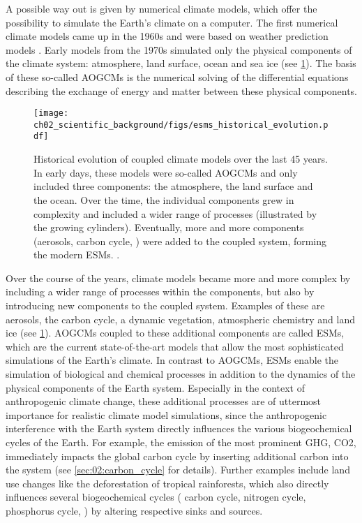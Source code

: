 A possible way out is given by numerical climate models, which offer the
possibility to simulate the Earth's climate on a computer. The first numerical
climate models came up in the 1960s and were based on weather prediction models
\autocite{Flato2011}. Early models from the 1970s simulated only the physical
components of the climate system: atmosphere, land surface, ocean and sea ice
(see \cref{fig:02:esms_historical_evolution}). The basis of these so-called
\acp{AOGCM} \autocite{Flato2013} is the numerical solving of the differential
equations describing the exchange of energy and matter between these physical
components.

\begin{figure}[t]
  \centering
  \texttt{[image: 
    ch02\_scientific\_background/figs/esms\_historical\_evolution.pdf]}
  \caption{Historical evolution of coupled climate models over the last 45
    years. In early days, these models were so-called \acfp{AOGCM} and only
    included three components: the atmosphere, the land surface and the ocean.
    Over the time, the individual components grew in complexity and included a
    wider range of processes (illustrated by the growing cylinders).
    Eventually, more and more components (aerosols, carbon cycle, \etc{}) were
    added to the coupled system, forming the modern \acfp{ESM}.
    .}
  \label{fig:02:esms_historical_evolution}
\end{figure}

Over the course of the years, climate models became more and more complex by
including a wider range of processes within the components, but also by
introducing new components to the coupled system. Examples of these are
aerosols, the carbon cycle, a dynamic vegetation, atmospheric chemistry and
land ice (see \cref{fig:02:esms_historical_evolution}). \acp{AOGCM} coupled to
these additional components are called \acfp{ESM}, which are the current
state-of-the-art models that allow the most sophisticated simulations of the
Earth's climate. In contrast to \acp{AOGCM}, \acp{ESM} enable the simulation of
biological and chemical processes in addition to the dynamics of the physical
components of the Earth system. Especially in the context of anthropogenic
climate change, these additional processes are of uttermost importance for
realistic climate model simulations, since the anthropogenic interference with
the Earth system directly influences the various biogeochemical cycles of the
Earth. For example, the emission of the most prominent \ac{GHG}, \ac{CO2},
immediately impacts the global carbon cycle by inserting additional carbon into
the system (see \cref{sec:02:carbon_cycle} for details). Further examples
include land use changes like the deforestation of tropical rainforests, which
also directly influences several biogeochemical cycles (\eg{} carbon cycle,
nitrogen cycle, phosphorus cycle, \etc{}) by altering respective sinks and
sources.

